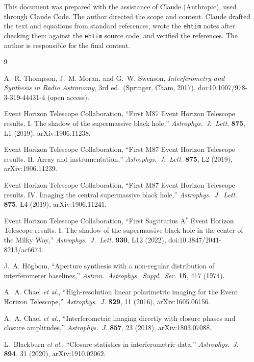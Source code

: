 \documentclass[11pt]{article}
\begin{document}
This document was prepared with the assistance of Claude (Anthropic), used
through Claude Code. The author directed the scope and content. Claude
drafted the text and equations from standard references, wrote the
\texttt{ehtim} notes after checking them against the \texttt{ehtim} source
code, and verified the references. The author is responsible for the final
content.

\begin{thebibliography}{9}

A.~R. Thompson, J.~M. Moran, and G.~W. Swenson,
\emph{Interferometry and Synthesis in Radio Astronomy}, 3rd ed.\
(Springer, Cham, 2017), doi:10.1007/978-3-319-44431-4 (open access).

Event Horizon Telescope Collaboration,
``First M87 Event Horizon Telescope results. I. The shadow of the
supermassive black hole,''
\emph{Astrophys.\ J.\ Lett.} \textbf{875}, L1 (2019), arXiv:1906.11238.

Event Horizon Telescope Collaboration,
``First M87 Event Horizon Telescope results. II. Array and instrumentation,''
\emph{Astrophys.\ J.\ Lett.} \textbf{875}, L2 (2019), arXiv:1906.11239.

Event Horizon Telescope Collaboration,
``First M87 Event Horizon Telescope results. IV. Imaging the central
supermassive black hole,''
\emph{Astrophys.\ J.\ Lett.} \textbf{875}, L4 (2019), arXiv:1906.11241.

Event Horizon Telescope Collaboration,
``First Sagittarius A$^*$ Event Horizon Telescope results. I. The shadow of
the supermassive black hole in the center of the Milky Way,''
\emph{Astrophys.\ J.\ Lett.} \textbf{930}, L12 (2022),
doi:10.3847/2041-8213/ac6674.

J.~A. H\"ogbom,
``Aperture synthesis with a non-regular distribution of interferometer
baselines,''
\emph{Astron.\ Astrophys.\ Suppl.\ Ser.} \textbf{15}, 417 (1974).

A.~A. Chael \emph{et al.},
``High-resolution linear polarimetric imaging for the Event Horizon
Telescope,''
\emph{Astrophys.\ J.} \textbf{829}, 11 (2016), arXiv:1605.06156.

A.~A. Chael \emph{et al.},
``Interferometric imaging directly with closure phases and closure
amplitudes,''
\emph{Astrophys.\ J.} \textbf{857}, 23 (2018), arXiv:1803.07088.

L.~Blackburn \emph{et al.},
``Closure statistics in interferometric data,''
\emph{Astrophys.\ J.} \textbf{894}, 31 (2020), arXiv:1910.02062.

\end{thebibliography}
\end{document}
